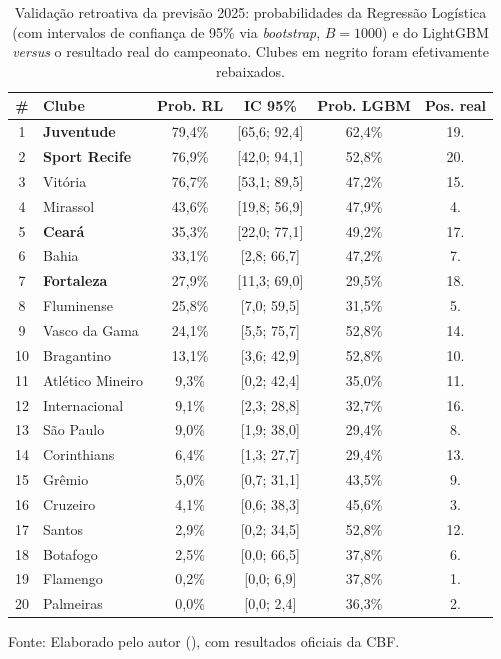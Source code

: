 \begin{table}[htbp]
    \centering
    \caption[Validação retroativa da previsão 2025]{Validação retroativa da previsão 2025: probabilidades da Regressão Logística (com intervalos de confiança de 95\% via \textit{bootstrap}, $B = 1000$) e do LightGBM \textit{versus} o resultado real do campeonato. Clubes em negrito foram efetivamente rebaixados.}
    \label{tab:validacao2025}
    \small
    \begin{tabular}{clcccc}
        \toprule
        \textbf{\#} & \textbf{Clube} & \textbf{Prob. RL} & \textbf{IC 95\%} & \textbf{Prob. LGBM} & \textbf{Pos. real} \\
        \midrule
        1 & \textbf{Juventude} & 79,4\% & [65,6; 92,4] & 62,4\% & 19.\textordmasculine{} \\
        2 & \textbf{Sport Recife} & 76,9\% & [42,0; 94,1] & 52,8\% & 20.\textordmasculine{} \\
        3 & Vitória & 76,7\% & [53,1; 89,5] & 47,2\% & 15.\textordmasculine{} \\
        4 & Mirassol & 43,6\% & [19,8; 56,9] & 47,9\% & 4.\textordmasculine{} \\
        \midrule
        5 & \textbf{Ceará} & 35,3\% & [22,0; 77,1] & 49,2\% & 17.\textordmasculine{} \\
        6 & Bahia & 33,1\% & [2,8; 66,7] & 47,2\% & 7.\textordmasculine{} \\
        7 & \textbf{Fortaleza} & 27,9\% & [11,3; 69,0] & 29,5\% & 18.\textordmasculine{} \\
        8 & Fluminense & 25,8\% & [7,0; 59,5] & 31,5\% & 5.\textordmasculine{} \\
        9 & Vasco da Gama & 24,1\% & [5,5; 75,7] & 52,8\% & 14.\textordmasculine{} \\
        10 & Bragantino & 13,1\% & [3,6; 42,9] & 52,8\% & 10.\textordmasculine{} \\
        11 & Atlético Mineiro & 9,3\% & [0,2; 42,4] & 35,0\% & 11.\textordmasculine{} \\
        12 & Internacional & 9,1\% & [2,3; 28,8] & 32,7\% & 16.\textordmasculine{} \\
        13 & São Paulo & 9,0\% & [1,9; 38,0] & 29,4\% & 8.\textordmasculine{} \\
        14 & Corinthians & 6,4\% & [1,3; 27,7] & 29,4\% & 13.\textordmasculine{} \\
        15 & Grêmio & 5,0\% & [0,7; 31,1] & 43,5\% & 9.\textordmasculine{} \\
        16 & Cruzeiro & 4,1\% & [0,6; 38,3] & 45,6\% & 3.\textordmasculine{} \\
        17 & Santos & 2,9\% & [0,2; 34,5] & 52,8\% & 12.\textordmasculine{} \\
        18 & Botafogo & 2,5\% & [0,0; 66,5] & 37,8\% & 6.\textordmasculine{} \\
        19 & Flamengo & 0,2\% & [0,0; 6,9] & 37,8\% & 1.\textordmasculine{} \\
        20 & Palmeiras & 0,0\% & [0,0; 2,4] & 36,3\% & 2.\textordmasculine{} \\
        \bottomrule
    \end{tabular}

    \vspace{2pt}
    {\small Fonte: Elaborado pelo autor (\the\year), com resultados oficiais da CBF.}
\end{table}
